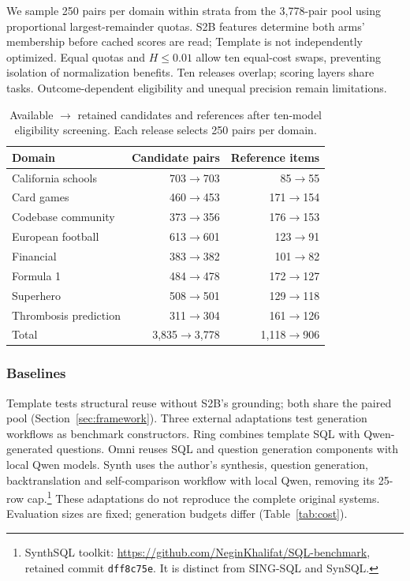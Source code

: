 We sample 250 pairs per domain within strata from the 3,778-pair pool using proportional largest-remainder quotas. S2B features determine both arms' membership before cached scores are read; Template is not independently optimized. Equal quotas and $H\le0.01$ allow ten equal-cost swaps, preventing isolation of normalization benefits. Ten releases overlap; scoring layers share tasks. Outcome-dependent eligibility and unequal precision remain limitations.

\begin{table}[t]\centering\small
\caption{Available $\to$ retained candidates and references after ten-model eligibility screening. Each release selects 250 pairs per domain.}
\label{tab:screening}
\begin{tabular}{lrr}\toprule
Domain & Candidate pairs & Reference items\\\midrule
California schools &703$\to$703&85$\to$55\\
Card games &460$\to$453&171$\to$154\\
Codebase community &373$\to$356&176$\to$153\\
European football &613$\to$601&123$\to$91\\
Financial &383$\to$382&101$\to$82\\
Formula 1 &484$\to$478&172$\to$127\\
Superhero &508$\to$501&129$\to$118\\
Thrombosis prediction &311$\to$304&161$\to$126\\\midrule
Total &3,835$\to$3,778&1,118$\to$906\\\bottomrule
\end{tabular}\end{table}


\subsubsection{Baselines}\label{sec:comparators}

Template tests structural reuse without S2B's grounding; both share the paired pool (Section~\ref{sec:framework}). Three external adaptations test generation workflows as benchmark constructors. Ring combines template SQL with Qwen-generated questions. Omni reuses SQL and question generation components with local Qwen models. Synth uses the author's synthesis, question generation, backtranslation and self-comparison workflow with local Qwen, removing its 25-row cap.\footnote{SynthSQL toolkit: \url{https://github.com/NeginKhalifat/SQL-benchmark}, retained commit \texttt{dff8c75e}. It is distinct from SING-SQL and SynSQL.} These adaptations do not reproduce the complete original systems. Evaluation sizes are fixed; generation budgets differ (Table~\ref{tab:cost}).


